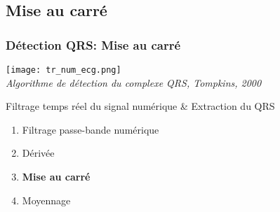 \documentclass{beamer}
\begin{document}
\subsection{Mise au carré}


\begin{frame}
\frametitle{Détection QRS: Mise au carré}
\begin{center}
\texttt{[image: tr\_num\_ecg.png]}\\
\textit{\footnotesize Algorithme de détection du complexe QRS, Tompkins, 2000}\\
\vspace{0.3cm}
\end{center}
Filtrage temps réel du signal numérique \& Extraction du QRS
\begin{enumerate}
\item Filtrage passe-bande numérique
\item Dérivée 
\item \textbf{Mise au carré }
\item Moyennage
\end{enumerate}
\end{frame}
\end{document}
